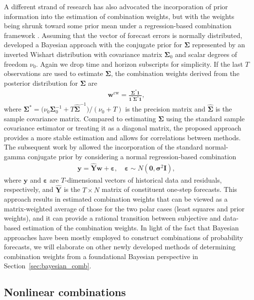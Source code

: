 \documentclass[a4paper,11pt]{article}
\begin{document}
A different strand of research has also advocated the incorporation of prior information into the estimation of combination weights, but with the weights being shrunk toward some prior mean under a regression-based combination framework \citep{Newbold2002-wa}. Assuming that the vector of forecast errors is normally distributed, \citet{Clemen1986-pd} developed a Bayesian approach with the conjugate prior for $\bm{\Sigma}$ represented by an inverted Wishart distribution with covariance matrix $\bm{\Sigma}_{0}$ and scalar degrees of freedom $\nu_{0}$. Again we drop time and horizon subscripts for simplicity. If the last $T$ observations are used to estimate $\bm{\Sigma}$, the combination weights derived from the posterior distribution for $\bm{\Sigma}$ are
\begin{align*}
  \bm{w}^{\text{cw}}=\frac{\bm{\Sigma}^{*}\bm{1}}{\bm{1}^{\prime} \bm{\Sigma}^{*} \bm{1}},
\end{align*}
where $\bm{\Sigma}^{*}=\big(\nu_{0} \bm{\Sigma}_{0}^{-1}+T \hat{\bm{\Sigma}}^{-1}\big) /(\nu_{0}+T)$ is the precision matrix and $\hat{\bm{\Sigma}}$ is the sample covariance matrix.
Compared to estimating $\bm{\Sigma}$ using the standard sample covariance estimator or treating it as a diagonal matrix, the proposed approach provides a more stable estimation and allows for correlations between methods. The subsequent work by \citet{Diebold1990-fk} allowed the incorporation of the standard normal-gamma conjugate prior by considering a normal regression-based combination
\begin{align*}
  \bm{y}=\hat{\bm{Y}} \bm{w}+\bm{\varepsilon}, \quad \bm{\varepsilon} \sim N\left(\bm{0}, \bm{\sigma}^{2} \bm{I}\right),
\end{align*}
where $\bm{y}$ and $\bm{\varepsilon}$ are $T$-dimensional vectors of historical data and residuals, respectively, and $\hat{\bm{Y}}$ is the $T \times N$ matrix of constituent one-step forecasts. This approach results in estimated combination weights that can be viewed as a matrix-weighted average of those for the two polar cases (least squares and prior weights), and it can provide a rational transition between subjective and data-based estimation of the combination weights. In light of the fact that Bayesian approaches have been mostly employed to construct combinations of probability forecasts, we will elaborate on other newly developed methods of determining combination weights from a foundational Bayesian perspective in Section~\ref{sec:bayesian_comb}.

\subsection{Nonlinear combinations}
\label{sec:nonlinear_comb}
\end{document}
